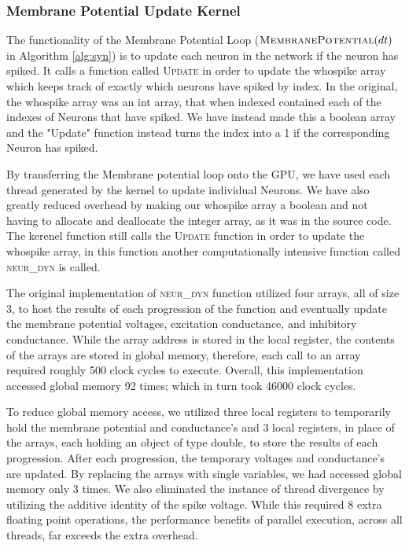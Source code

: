 \documentclass[a4paper]{article}
\begin{document}
\subsubsection{Membrane Potential Update Kernel}

The functionality of the Membrane Potential Loop ($\textsc{MembranePotential}(dt)$ in Algorithm \ref{alg:syn}) is to update each neuron in the network if the neuron has spiked.  It calls a function called \textsc{Update} in order to update the whospike array which keeps track of exactly which neurons have spiked by index. In the original, the whospike array was an int array, that when indexed contained each of the indexes of Neurons that have spiked. We have instead made this a boolean array and the "Update" function instead turns the index into a 1 if the corresponding Neuron has spiked.

By transferring the Membrane potential loop onto the GPU, we have used each thread generated by the kernel to update individual Neurons. We have also greatly reduced overhead by making our whospike array a boolean and not having to allocate and deallocate the integer array, as it was in the source code. The kerenel function still calls the \textsc{Update} function in order to update the whospike array, in this function another computationally intensive function called \textsc{neur\_dyn} is called.

The original implementation of \textsc{neur\_dyn} function utilized four arrays, all of size 3, to host the results of each progression of the function and eventually update the membrane potential voltages, excitation conductance, and inhibitory conductance. While the array address is stored in the local register, the contents of the arrays are stored in global memory, therefore, each call to an array required roughly 500 clock cycles to execute. Overall, this implementation accessed global memory 92 times; which in turn took 46000 clock cycles. 

To reduce global memory access, we utilized three local registers to temporarily hold the membrane potential and conductance's and 3 local registers, in place of the arrays, each holding an object of type double, to store the results of each progression. After each progression, the temporary voltages and conductance's are updated. By replacing the arrays with single variables, we had accessed global memory only 3 times. We also eliminated the instance of thread divergence by utilizing the additive identity of the spike voltage. While this required 8 extra floating point operations, the performance benefits of parallel execution, across all threads, far exceeds the extra overhead. 
 
\end{document}
